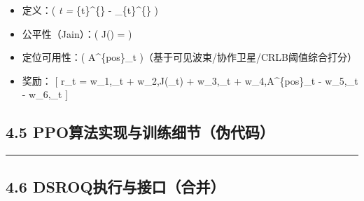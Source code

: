 \begin{itemize}
\tightlist
\item
  定义：( \Delta{}\emph{t =
  }\{t\}\^{}\{\} -
  \_\{t\}\^{}\{\} )
\item
  公平性（Jain）：( J() =
   )
\item
  定位可用性：( A\^{}\{pos\}\_t
  \in [0,1] )（基于可见波束/协作卫星/CRLB阈值综合打分）
\item
  奖励： {[} r\_t = w\_1,\Delta{}\_t + w\_2,J(\_t) +
  w\_3,\_t + w\_4,A\^{}\{pos\}\_t - w\_5,\_t -
  w\_6,\_t {]}
\end{itemize}

\subsection{4.5
PPO算法实现与训练细节（伪代码）}\label{ppoux7b97ux6cd5ux5b9eux73b0ux4e0eux8badux7ec3ux7ec6ux8282ux4f2aux4ee3ux7801}

\begin{Shaded}
\begin{Highlighting}[]
\OperatorTok{=}
 
\OperatorTok{=}
\OperatorTok{=}
\OperatorTok{=}
\NormalTok{)}
\end{Highlighting}
\end{Shaded}

\begin{center}\rule{0.5\linewidth}{0.5pt}\end{center}

\subsection{4.6
DSROQ执行与接口（合并）}\label{dsroqux6267ux884cux4e0eux63a5ux53e3ux5408ux5e76}

